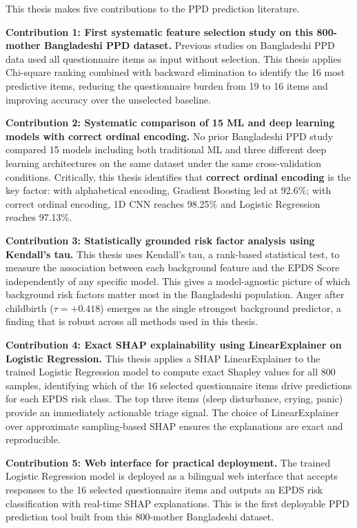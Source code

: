 This thesis makes five contributions to the PPD prediction literature.

\textbf{Contribution 1: First systematic feature selection study on this 800-mother Bangladeshi PPD dataset.}
Previous studies on Bangladeshi PPD data used all questionnaire items as input without selection.
This thesis applies Chi-square ranking combined with backward elimination to identify the 16 most predictive items, reducing the questionnaire burden from 19 to 16 items and improving accuracy over the unselected baseline.

\textbf{Contribution 2: Systematic comparison of 15 ML and deep learning models with correct ordinal encoding.}
No prior Bangladeshi PPD study compared 15 models including both traditional ML and three different deep learning architectures on the same dataset under the same cross-validation conditions.
Critically, this thesis identifies that \textbf{correct ordinal encoding} is the key factor: with alphabetical encoding, Gradient Boosting led at 92.6\%; with correct ordinal encoding, 1D CNN reaches 98.25\% and Logistic Regression reaches 97.13\%.

\textbf{Contribution 3: Statistically grounded risk factor analysis using Kendall's tau.}
This thesis uses Kendall's tau, a rank-based statistical test, to measure the association between each background feature and the EPDS Score independently of any specific model.
This gives a model-agnostic picture of which background risk factors matter most in the Bangladeshi population.
Anger after childbirth ($\tau = +0.418$) emerges as the single strongest background predictor, a finding that is robust across all methods used in this thesis.

\textbf{Contribution 4: Exact SHAP explainability using LinearExplainer on Logistic Regression.}
This thesis applies a SHAP LinearExplainer to the trained Logistic Regression model to compute exact Shapley values for all 800 samples, identifying which of the 16 selected questionnaire items drive predictions for each EPDS risk class.
The top three items (sleep disturbance, crying, panic) provide an immediately actionable triage signal.
The choice of LinearExplainer over approximate sampling-based SHAP ensures the explanations are exact and reproducible.

\textbf{Contribution 5: Web interface for practical deployment.}
The trained Logistic Regression model is deployed as a bilingual web interface that accepts responses to the 16 selected questionnaire items and outputs an EPDS risk classification with real-time SHAP explanations.
This is the first deployable PPD prediction tool built from this 800-mother Bangladeshi dataset.


